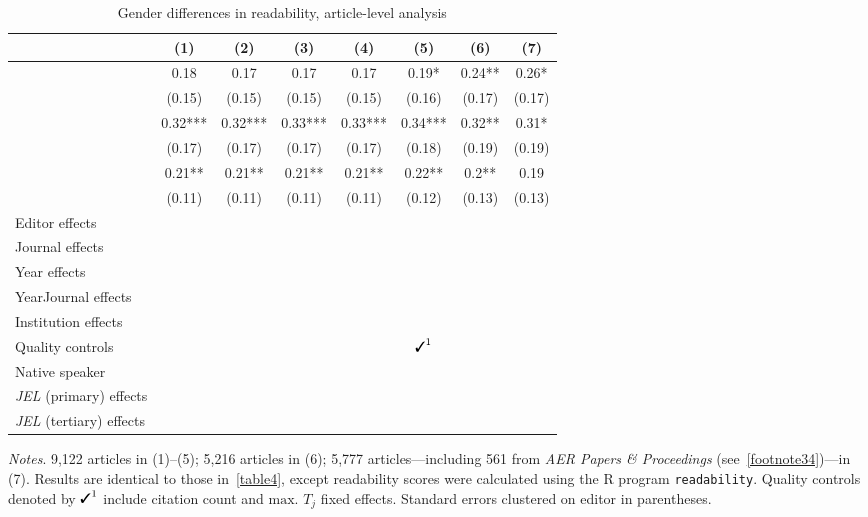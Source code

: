 \begin{table}[H]
	\footnotesize	
\centering	
	\begin{threeparttable}
		\caption{Gender differences in readability, article-level analysis}
		\label{table4}
		\begin{tabular}{p{2.64cm}S@{}S@{}S@{}S@{}S@{}S@{}S@{}}
			\toprule
			 &{(1)}&{(2)}&{(3)}&{(4)}&{(5)}&{(6)}&{(7)} \\
			\midrule
			&0.18 &0.17 &0.17 &0.17 &0.19*&0.24**&0.26*\\
			&(0.15)&(0.15)&(0.15)&(0.15)&(0.16)&(0.17)&(0.17)\\
			&0.32***&0.32***&0.33***&0.33***&0.34***&0.32**&0.31*\\
			&(0.17)&(0.17)&(0.17)&(0.17)&(0.18)&(0.19)&(0.19)\\
			&0.21**&0.21**&0.21**&0.21**&0.22**&0.2**&0.19 \\
			&(0.11)&(0.11)&(0.11)&(0.11)&(0.12)&(0.13)&(0.13)\\
			\midrule
			Editor effects&{\ding{51}}&{}&{}&{}&{}&{}&{}\\
			Journal effects&{}&{}&{}&{}&{}&{}&{}\\
			Year effects&&{}&{}&{}&{}&{}&{}\\
			Year\times\)Journal effects&&&{}&{}&{}&{}&{}\\
			Institution effects&&&&{}&{}&{}&{}\\
			Quality controls&&&&&{\(\text{}^1\)}&{\ding{51}}&{}\\
			Native speaker&&&&&{}&{}&{}\\
			\textit{JEL} (primary) effects&&&&&&{}&\\
			\textit{JEL} (tertiary) effects&&&&&&&{}\\
			\bottomrule
		\end{tabular}
		\begin{tablenotes}
			\tiny
			\item \textit{Notes}. 9,122 articles in (1)--(5); 5,216 articles in (6); 5,777 articles---including 561 from \textit{AER Papers \& Proceedings} (see~\autoref{footnote34})---in (7). Results are identical to those in~\autoref{table4}, except readability scores were calculated using the R program \texttt{readability}. Quality controls denoted by \(\text{}^1\) include citation count and \(\text{max. }T_j\) fixed effects. Standard errors clustered on editor in parentheses.
		\end{tablenotes}
	\end{threeparttable}
\end{table}

